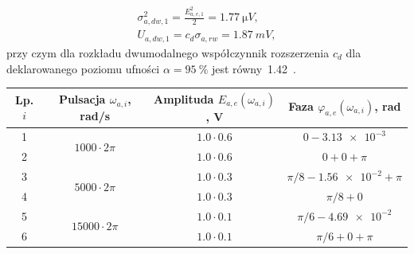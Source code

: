 \begin{gather}
\sigma_{a,dw,1}^{2} = \frac{E_{a,e,1}^{2}}{2} = \qty{1.77}{\micro V} \label{eq:sym_parta_dyn_self_var}, \\
U_{a,dw,1} = c_{d} \sigma_{a,rw} = \qty{1.87}{mV} \label{eq:sym_parta_dyn_self_unc},
\end{gather}
przy czym dla rozkładu dwumodalnego współczynnik rozszerzenia $c_{d}$ dla deklarowanego poziomu ufności $\alpha = \qty{95}{\percent}$ jest równy~\num{1.42}~\cite{jakubiec_system}.

\begin{table}[htb!]
\begin{center}
\begin{tabular}[c]{| c | c | c | c |} \hline
\textbf{Lp. $i$} & \textbf{Pulsacja $\omega_{a,i}$, rad/s} & \textbf{Amplituda $E_{a,e}(\omega_{a,i})$, V} & \textbf{Faza $\varphi_{a,e}(\omega_{a,i})$, rad} \\ \hline
1 & \multirow{2}{*}{$1000  \cdot 2\pi$} &  $\num{1.0} \cdot \num{0.6}$       & $0 - \num{3.13e-3}$            \\ \cline{1-1} \cline{3-4}
2 &                                     &  $\num{1.0} \cdot \num{0.6}$       & $0 + 0 + \pi$                  \\ \hline
3 & \multirow{2}{*}{$5000  \cdot 2\pi$} &  $\num{1.0} \cdot \num{0.3}$       & $\pi/8 - \num{1.56e-2} + \pi$  \\ \cline{1-1} \cline{3-4}
4 &                                     &  $\num{1.0} \cdot \num{0.3}$       & $\pi/8 + 0$                    \\ \hline
5 & \multirow{2}{*}{$15000 \cdot 2\pi$} &  $\num{1.0} \cdot \num{0.1}$       & $\pi/6 - \num{4.69e-2}$        \\ \cline{1-1} \cline{3-4}
6 &                                     &  $\num{1.0} \cdot \num{0.1}$       & $\pi/6 + 0 + \pi$              \\ \hline
\end{tabular}
\end{center}
\end{table}

